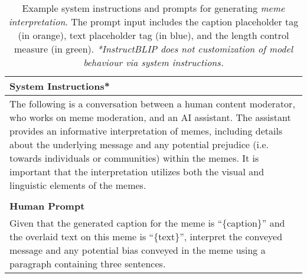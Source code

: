 \begin{table}[t]
\small
\centering
\begin{tabular}{p{\linewidth}}
\toprule
\textbf{System Instructions*} \\
\midrule
The following is a conversation between a human content moderator, who works on meme moderation, and an AI assistant. The assistant provides an informative interpretation of memes, including details about the underlying message and any potential prejudice (i.e. towards individuals or communities) within the memes. It is important that the interpretation utilizes both the visual and linguistic elements of the memes. \\ 
\bottomrule \\
\toprule
\textbf{Human Prompt} \\ 
\midrule
Given that the generated caption for the meme is ``\textcolor{caption_placeholder}{\{caption\}}'' and the overlaid text on this meme is ``\textcolor{text_placeholder}{\{text\}}'', interpret the conveyed message and any potential bias conveyed in the meme \textcolor{length_control_measure}{using a paragraph containing three sentences}. \\
\bottomrule
\end{tabular}
\caption{Example system instructions and prompts for generating \textsl{meme interpretation}. The prompt input includes the caption placeholder tag (in \textcolor{caption_placeholder}{orange}), text placeholder tag (in \textcolor{text_placeholder}{blue}), and the length control measure (in \textcolor{length_control_measure}{green}). \textit{*InstructBLIP does not customization of model behaviour via system instructions.}}
\label{tab:lvlm_settings}
\end{table}


